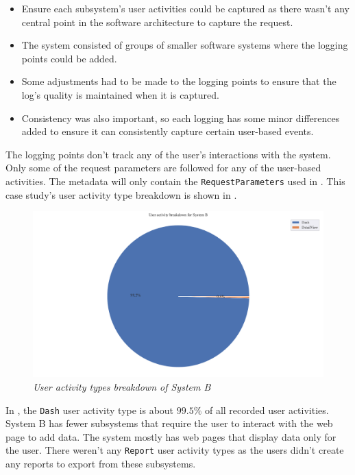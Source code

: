 \begin{itemize}
	\item Ensure each subsystem's user activities could be captured as there wasn't any central point in the software architecture to capture the request. 
	\item The system consisted of groups of smaller software systems where the logging points could be added.
	\item Some adjustments had to be made to the logging points to ensure that the log's quality is maintained when it is captured. 
	\item Consistency was also important, so each logging has some minor differences added to ensure it can consistently capture certain user-based events. \
\end{itemize}

The logging points don't track any of the user's interactions with the system. Only some of the request parameters are followed for any of the user-based activities. The metadata will only contain the \texttt{RequestParameters} used in . This case study's user activity type breakdown is shown in .

\begin{figure}[!htb]
	\centering %
	\includegraphics[width=0.95\linewidth]{img/ch3/analysis/case_B_breakdown.pdf}
	\caption[User activity types breakdown of System B]
	{\textit{User activity types breakdown of System B}}\label{fig:ch3_caseBBreakdown}
\end{figure}

In , the \texttt{Dash} user activity type is about $99.5\%$ of all recorded user activities. System B has fewer subsystems that require the user to interact with the web page to add data. The system mostly has web pages that display data only for the user. There weren't any \texttt{Report} user activity types as the users didn't create any reports to export from these subsystems.

